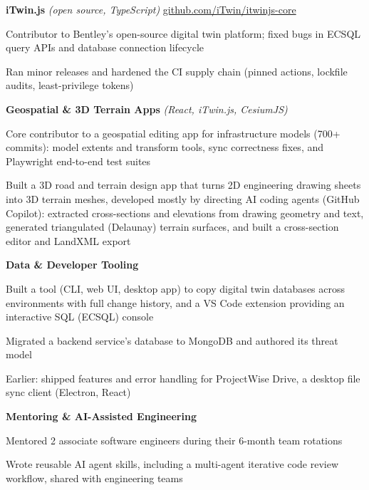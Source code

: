 \documentclass[]{deedy-resume-openfont}
\begin{document}
\begin{minipage}[t]{0.66\textwidth}
{\bf iTwin.js} \textit{(open source, TypeScript)} \href{https://github.com/iTwin/itwinjs-core}{github.com/iTwin/itwinjs-core}
\begin{tightemize}
\item Contributor to Bentley's open-source digital twin platform; fixed bugs in ECSQL query APIs and database connection lifecycle
\item Ran minor releases and hardened the CI supply chain (pinned actions, lockfile audits, least-privilege tokens)
\end{tightemize}
\vspace{4pt}

{\bf Geospatial \& 3D Terrain Apps} \textit{(React, iTwin.js, CesiumJS)}
\begin{tightemize}
\item Core contributor to a geospatial editing app for infrastructure models (700+ commits): model extents and transform tools, sync correctness fixes, and Playwright end-to-end test suites
\item Built a 3D road and terrain design app that turns 2D engineering drawing sheets into 3D terrain meshes, developed mostly by directing AI coding agents (GitHub Copilot): extracted cross-sections and elevations from drawing geometry and text, generated triangulated (Delaunay) terrain surfaces, and built a cross-section editor and LandXML export
\end{tightemize}
\vspace{4pt}

{\bf Data \& Developer Tooling}
\begin{tightemize}
\item Built a tool (CLI, web UI, desktop app) to copy digital twin databases across environments with full change history, and a VS Code extension providing an interactive SQL (ECSQL) console
\item Migrated a backend service's database to MongoDB and authored its threat model
\item Earlier: shipped features and error handling for ProjectWise Drive, a desktop file sync client (Electron, React)
\end{tightemize}
\vspace{4pt}

{\bf Mentoring \& AI-Assisted Engineering}
\begin{tightemize}
\item Mentored 2 associate software engineers during their 6-month team rotations
\item Wrote reusable AI agent skills, including a multi-agent iterative code review workflow, shared with engineering teams
\end{tightemize}
\sectionsep

\end{minipage}
\end{document}
